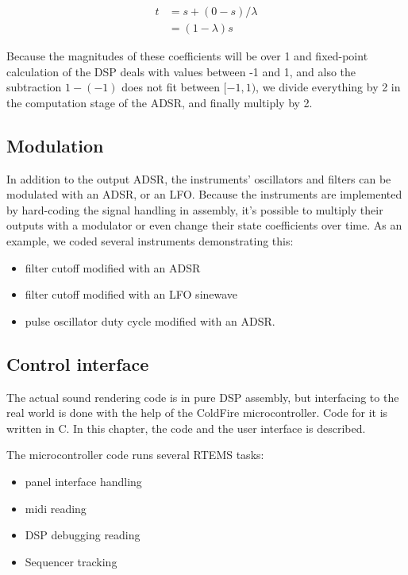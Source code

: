 \documentclass[10pt,a4paper,oneside]{article}
\begin{document}
\[
\begin{split}
 t &= s + (0 - s) / \lambda\\
   &= (1 - \lambda) s
\end{split}
\]

Because the magnitudes of these coefficients will be over 1 and fixed-point calculation of the DSP deals with values between -1 and 1, and also the subtraction $1-(-1)$ does not fit between $[-1,1)$, we divide everything by 2 in the computation stage of the ADSR, and finally multiply by 2.


\subsection{Modulation}

In addition to the output ADSR, the instruments' oscillators and filters can be modulated with an ADSR, or an LFO. Because the instruments are implemented by hard-coding the signal handling in assembly, it's possible to multiply their outputs with a modulator or even change their state coefficients over time. As an example, we coded several instruments demonstrating this:

\begin{itemize}
	\item filter cutoff modified with an ADSR
	\item filter cutoff modified with an LFO sinewave
	\item pulse oscillator duty cycle modified with an ADSR.
\end{itemize}


\subsection{Control interface}

The actual sound rendering code is in pure DSP assembly, but interfacing to the real world is done with the help of the ColdFire microcontroller. Code for it is written in C. In this chapter, the code and the user interface is described.

The microcontroller code runs several RTEMS tasks:

\begin{itemize}
	\item panel interface handling
	\item midi reading
	\item DSP debugging reading
	\item Sequencer tracking
\end{itemize}
\end{document}
